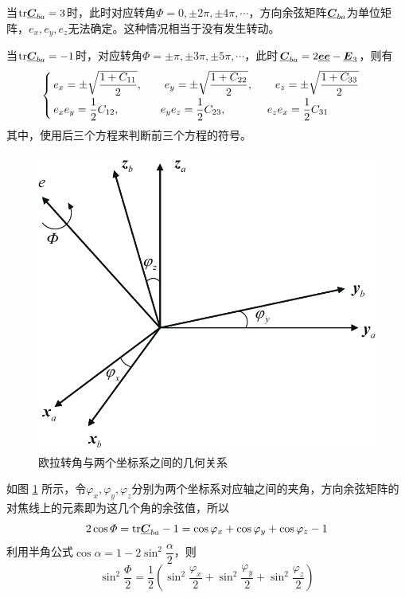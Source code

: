 \noa[2] 当$\text{tr} \underline{\bm{C}}_{ba} = 3$时，此时对应转角$\varPhi = 0, \pm 2 \pi, \pm 4 \pi, \cdots$，方向余弦矩阵$\underline{\bm{C}}_{ba}$为单位矩阵，$e_x, e_y, e_z$无法确定。这种情况相当于没有发生转动。

\noa[3] 当$\text{tr} \underline{\bm{C}}_{ba} = -1$时，对应转角$\varPhi = \pm \pi, \pm 3 \pi, \pm 5 \pi, \cdots$，此时$\underline{\bm{C}}_{ba} = 2 \underline{\bm{e}}\underline{\bm{e}} - \underline{\bm{E}}_3$，则有
\begin{equation}
	\begin{cases}
		\, e_x = \pm \sqrt{\dfrac{1 + C_{11}}{2}}, \qquad e_y = \pm \sqrt{\dfrac{1+ C_{22}}{2}}, \qquad e_z = \pm \sqrt{\dfrac{1 + C_{33}}{2}} \\[0.5em]
		\, e_x e_y = \dfrac{1}{2} C_{12}, \hspace*{3.7em} e_ye_z = \dfrac{1}{2}C_{23}, \hspace*{3.7em} e_ze_x = \dfrac{1}{2} C_{31}
	\end{cases}
\end{equation}
其中，使用后三个方程来判断前三个方程的符号。

\begin{figure}[!htb]
	\centering
	\includegraphics[width=0.42\linewidth]{pic/欧拉轴角变换}
	\vspace*{-1em}
	\caption{欧拉转角与两个坐标系之间的几何关系}
	\label{欧拉转角变换}
\end{figure}


\sssection[欧拉转角的几何意义]

如图 \ref{欧拉转角变换} 所示，令$\varphi_x, \varphi_y, \varphi_z$分别为两个坐标系对应轴之间的夹角，方向余弦矩阵的对焦线上的元素即为这几个角的余弦值，所以
\begin{equation}
	2 \cos \varPhi = \text{tr} \underline{\bm{C}}_{ba} - 1 = \cos \varphi_x + \cos \varphi_y + \cos \varphi_z - 1
\end{equation}
利用半角公式$\cos \alpha = 1 - 2 \sin^2 \dfrac{\alpha}{2}$，则
\begin{equation}
	\sin^2 \dfrac{\varPhi}{2} = \dfrac{1}{2} \left( \sin^2 \dfrac{\varphi_x}{2} + \sin^2 \dfrac{\varphi_y}{2} + \sin^2 \dfrac{\varphi_z}{2} \right)
\end{equation}

